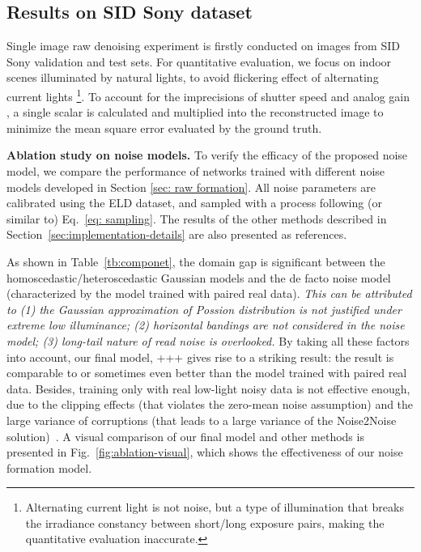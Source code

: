 \documentclass[10pt,twocolumn,letterpaper]{article}
\begin{document}
\subsection{Results on SID Sony dataset}
Single image raw denoising experiment is firstly conducted on images from SID Sony validation and test sets.
For quantitative evaluation, we focus on indoor scenes illuminated by natural lights, to avoid flickering effect of alternating current lights \cite{Abdelhamed_2018_CVPR}
\footnote{Alternating current light is not noise, but a type of
illumination that breaks the irradiance constancy between short/long exposure pairs, making the quantitative evaluation inaccurate.}. To account for the imprecisions of shutter speed and analog gain \cite{Abdelhamed_2018_CVPR}, a single scalar
is calculated and multiplied into the reconstructed image to
minimize the mean square error evaluated by the ground
truth.


\vspace{3pt}
\noindent\textbf{Ablation study on noise models.}
To verify the efficacy of the proposed noise model, we compare the performance of networks trained with different noise models developed in Section \ref{sec: raw formation}.
All noise parameters are calibrated using the ELD
dataset, and sampled with a process following (or similar to) Eq.~\eqref{eq: sampling}.
The results of the other methods described in Section~\ref{sec:implementation-details} are also presented as references. 



As shown in Table~\ref{tb:componet}, the domain gap is significant between the
homoscedastic/heteroscedastic Gaussian models and the de facto noise model
(characterized by the model trained with paired real data). \textit{This can be
attributed to (1) the Gaussian approximation of Possion distribution is not
justified under extreme low illuminance; (2) horizontal bandings are not
considered in the noise model; (3) long-tail nature of read noise is overlooked. }
By taking all these factors into account, our final model, \ie +++ gives
rise to a striking result: the result is comparable to or sometimes even better
than the model trained with paired real data. 
Besides, training only with real low-light noisy data is not effective enough,
due to the clipping effects (that violates the zero-mean noise assumption) and
the large variance of corruptions (that leads to a large variance of the
Noise2Noise solution)~\cite{pmlr-v80-lehtinen18a}. A visual comparison of our final model and other methods is presented in Fig.~\ref{fig:ablation-visual}, which shows the effectiveness of our noise formation model.
\end{document}
